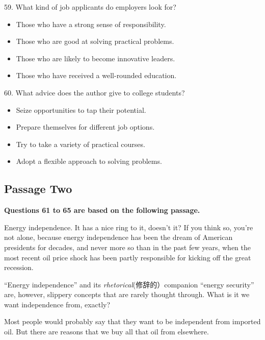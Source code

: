 \documentclass[UTF8,11pt]{ctexart}
\begin{document}
59. What kind of job applicants do employers look for?


\begin{itemize}[leftmargin=2em,itemsep=.2em,topsep=.4em]\item[A.] Those who have a strong sense of responsibility.
\item[B.] Those who are good at solving practical problems.
\item[C.] Those who are likely to become innovative leaders.
\item[D.] Those who have received a well-rounded education.
\end{itemize}

60. What advice does the author give to college students?


\begin{itemize}[leftmargin=2em,itemsep=.2em,topsep=.4em]\item[A.] Seize opportunities to tap their potential.
\item[C.] Prepare themselves for different job options.
\end{itemize}

\begin{itemize}[leftmargin=2em,itemsep=.2em,topsep=.4em]\item[B.] Try to take a variety of practical courses.
\item[D.] Adopt a flexible approach to solving problems.
\end{itemize}

\subsection*{Passage Two}


\textbf{Questions 61 to 65 are based on the following passage.}


Energy independence. It has a nice ring to it, doesn’t it? If you think so, you’re not alone, because energy independence has been the dream of American presidents for decades, and never more so than in the past few years, when the most recent oil price shock has been partly responsible for kicking off the great recession.


“Energy independence” and its\textit{ rhetorical}(修辞的）companion “energy security” are, however, slippery concepts that are rarely thought through. What is it we want independence from, exactly?


Most people would probably say that they want to be independent from imported oil. But there are reasons that we buy all that oil from elsewhere.
\end{document}
